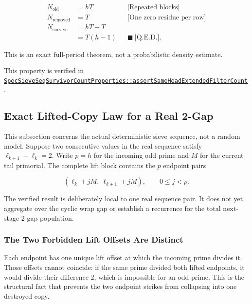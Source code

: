 \begin{equation*}
\begin{aligned}
N_{\mathrm{old}} &= hT
  &&\text{[Repeated blocks]} \\
N_{\mathrm{removed}} &= T
  &&\text{[One zero residue per row]} \\
N_{\mathrm{survive}}
  &=hT-T \\
  &=T(h-1)
  &&\blacksquare\ \text{[Q.E.D.]}.
\end{aligned}
\end{equation*}

This is an exact full-period theorem, not a probabilistic density
estimate.

{\raggedright
This property is verified in
\href{https://github.com/thiagomata/prime-numbers/blob/master/src/main/scala/v1/chapter6/sieve/seq/spec/properties/SpecSieveSeqSurvivorCountProperties.scala}{\texttt{SpecSieveSeqSurvivorCountProperties::assertSameHeadExtendedFilterCount}}.
\par}

\subsection{Exact Lifted-Copy Law for a Real 2-Gap}
\label{sec:exact-lifted-copy-law}

This subsection concerns the actual deterministic sieve sequence, not a
random model. Suppose two consecutive values in the real sequence satisfy
$\ell_{k+1}-\ell_k=2$. Write $p=h$ for the incoming odd prime and $M$ for
the current tail primorial. The complete lift block contains the $p$
endpoint pairs

\begin{equation*}
(\ell_k+jM,\ \ell_{k+1}+jM),
\qquad 0\le j\lt p.
\end{equation*}

The verified result is deliberately local to one real sequence pair. It
does not yet aggregate over the cyclic wrap gap or establish a recurrence
for the total next-stage 2-gap population.

\subsubsection{The Two Forbidden Lift Offsets Are Distinct}
\label{sec:two-forbidden-lift-offsets}

Each endpoint has one unique lift offset at which the incoming prime
divides it. Those offsets cannot coincide: if the same prime divided both
lifted endpoints, it would divide their difference $2$, which is
impossible for an odd prime. This is the structural fact that prevents
the two endpoint strikes from collapsing into one destroyed copy.

